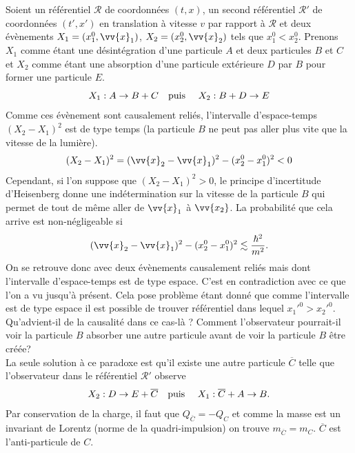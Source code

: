 \documentclass[a4paper,11pt]{report}
\theoremstyle{definition}
\theoremstyle{plain}
\theoremstyle{definition}
\theoremstyle{remark}
\newcommand{\R}{\mathcal{R}}
\begin{document}
            Soient un référentiel $\R$ de coordonnées $(t,x)$, un second référentiel $\R'$ de coordonnées $(t',x')$ en translation à vitesse $v$ par rapport à $\R$ et deux évènements $X_1 = (x_1^0,\vv{x}_1)$, $X_2 = (x_2^0,\vv{x}_2)$ tels que $x_1^0<x_2^0$. Prenons $X_1$ comme étant une désintégration d'une particule $A$ et deux particules $B$ et $C$ et $X_2$ comme étant une absorption d'une particule extérieure $D$ par $B$ pour former une particule $E$.
            \begin{equation}
                X_1 : A\to B+C \text{\quad puis \quad} X_2 : B+D\to E
            \end{equation}
            Comme ces évènement sont causalement reliés, l'intervalle d'espace-temps $(X_2-X_1)^2$ est de type temps (la particule $B$ ne peut pas aller plus vite que la vitesse de la lumière).
            \begin{equation}
                (X_2-X_1)^2 = (\vv{x}_2-\vv{x}_1)^2 - (x_2^0-x_1^0)^2 < 0
            \end{equation}
            Cependant, si l'on suppose que $(X_2-X_1)^2 > 0$, le principe d'incertitude d'Heisenberg donne une indétermination sur la vitesse de la particule $B$ qui permet de tout de même aller de $\vv{x}_1$ à $\vv{x_2}$. La probabilité que cela arrive est non-négligeable si
            \begin{equation}
                (\vv{x}_2-\vv{x}_1)^2 - (x_2^0-x_1^0)^2 \lesssim \frac{\hbar^2}{m^2}.
            \end{equation}
            On se retrouve donc avec deux évènements causalement reliés mais dont l'intervalle d'espace-temps est de type espace. C'est en contradiction avec ce que l'on a vu jusqu'à présent. Cela pose problème étant donné que comme l'intervalle est de type espace il est possible de trouver référentiel dans lequel $x_1'^0 > x_2'^0$. Qu'advient-il de la causalité dans ce cas-là ? Comment l'observateur pourrait-il voir la particule $B$ absorber une autre particule avant de voir la particule $B$ être créée?\\
            
            La seule solution à ce paradoxe est qu'il existe une autre particule $\overline{C}$ telle que l'observateur dans le référentiel $\R'$ observe
            \begin{equation}
                X_2 : D\to E+\overline{C} \text{\quad puis \quad} X_1 : \overline{C}+A\to B.
            \end{equation}
            Par conservation de la charge, il faut que $Q_{\overline{C}} = -Q_C$ et comme la masse est un invariant de Lorentz (norme de la quadri-impulsion) on trouve $m_{\overline{C}} = m_C$. $\overline{C}$ est l'anti-particule de $C$.\\
            
\end{document}
